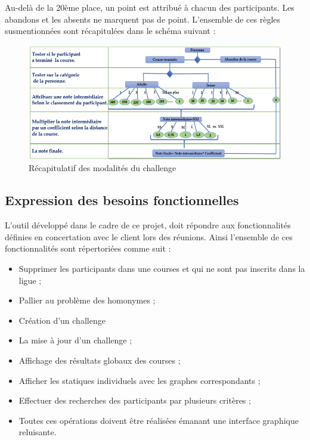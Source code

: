 \documentclass[12pt,a4paper]{report}
\begin{document}
	Au-delà de la 20ème place, un point est attribué à chacun des participants. Les abandons et les absents ne marquent pas de point. 
	L’ensemble de ces règles susmentionnées sont récapitulées dans le schéma suivant :
	\begin{figure}
	   \center
	   \includegraphics[scale=0.5]{recapitulatif_modalite_challenge.png}
	   \caption {Récapitulatif des modalités du challenge}
	\end{figure}
	
	\subsection{Expression des besoins fonctionnelles}
	L’outil développé dans le cadre de ce projet, doit répondre aux fonctionnalités définies en concertation avec le client lors des réunions. Ainsi l’ensemble de ces fonctionnalités sont répertoriées comme suit :
	\begin{itemize} 
	\item Supprimer les participants dans une courses et qui ne sont pas inscrits dans la ligue ;	
	\item Pallier au problème des homonymes ;
	\item Création d’un challenge
	\item La mise à jour d’un challenge ;
	\item Affichage des résultats globaux des courses ;
	\item Afficher les statiques individuels avec les graphes correspondants ;
	\item Effectuer des recherches des participants par plusieurs critères ;
	\item Toutes ces opérations doivent être réalisées émanant une interface graphique reluisante.
	\end{itemize} 
	
\end{document}
